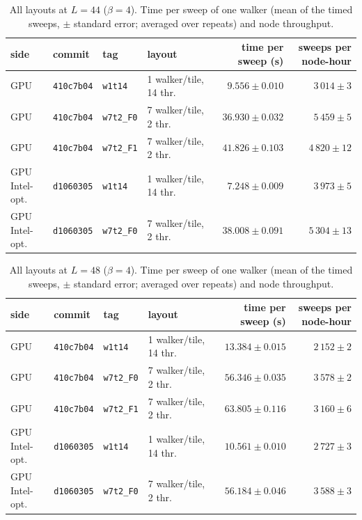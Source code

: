 \begin{table}[h]\centering\small
\caption{All layouts at $L=44$ ($\beta=4$). Time per sweep of one walker (mean of the timed sweeps, $\pm$ standard error; averaged over repeats) and node throughput.}
\begin{tabular}{@{}llllrr@{}}\toprule
side & commit & tag & layout & time per sweep (s) & sweeps per node-hour\\\midrule
GPU & \texttt{410c7b04} & \texttt{w1t14} & 1 walker/tile, 14 thr. & $9.556 \pm 0.010$ & $3\,014 \pm 3$\\
GPU & \texttt{410c7b04} & \texttt{w7t2\_F0} & 7 walker/tile, 2 thr. & $36.930 \pm 0.032$ & $5\,459 \pm 5$\\
GPU & \texttt{410c7b04} & \texttt{w7t2\_F1} & 7 walker/tile, 2 thr. & $41.826 \pm 0.103$ & $4\,820 \pm 12$\\
GPU Intel-opt. & \texttt{d1060305} & \texttt{w1t14} & 1 walker/tile, 14 thr. & $7.248 \pm 0.009$ & $3\,973 \pm 5$\\
GPU Intel-opt. & \texttt{d1060305} & \texttt{w7t2\_F0} & 7 walker/tile, 2 thr. & $38.008 \pm 0.091$ & $5\,304 \pm 13$\\
\bottomrule\end{tabular}\end{table}
\begin{table}[h]\centering\small
\caption{All layouts at $L=48$ ($\beta=4$). Time per sweep of one walker (mean of the timed sweeps, $\pm$ standard error; averaged over repeats) and node throughput.}
\begin{tabular}{@{}llllrr@{}}\toprule
side & commit & tag & layout & time per sweep (s) & sweeps per node-hour\\\midrule
GPU & \texttt{410c7b04} & \texttt{w1t14} & 1 walker/tile, 14 thr. & $13.384 \pm 0.015$ & $2\,152 \pm 2$\\
GPU & \texttt{410c7b04} & \texttt{w7t2\_F0} & 7 walker/tile, 2 thr. & $56.346 \pm 0.035$ & $3\,578 \pm 2$\\
GPU & \texttt{410c7b04} & \texttt{w7t2\_F1} & 7 walker/tile, 2 thr. & $63.805 \pm 0.116$ & $3\,160 \pm 6$\\
GPU Intel-opt. & \texttt{d1060305} & \texttt{w1t14} & 1 walker/tile, 14 thr. & $10.561 \pm 0.010$ & $2\,727 \pm 3$\\
GPU Intel-opt. & \texttt{d1060305} & \texttt{w7t2\_F0} & 7 walker/tile, 2 thr. & $56.184 \pm 0.046$ & $3\,588 \pm 3$\\
\bottomrule\end{tabular}\end{table}
